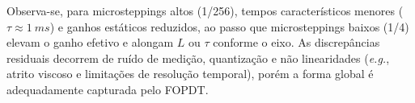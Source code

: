 Observa-se, para microsteppings altos (1/256), tempos característicos
menores ($\tau\approx\SI{1}{ms}$) e ganhos estáticos reduzidos, ao passo
que microsteppings baixos (1/4) elevam o ganho efetivo e alongam $L$ ou
$\tau$ conforme o eixo. As discrepâncias residuais decorrem de ruído de
medição, quantização e não linearidades (\emph{e.g.}, atrito viscoso e
limitações de resolução temporal), porém a forma global é adequadamente
capturada pelo FOPDT.
